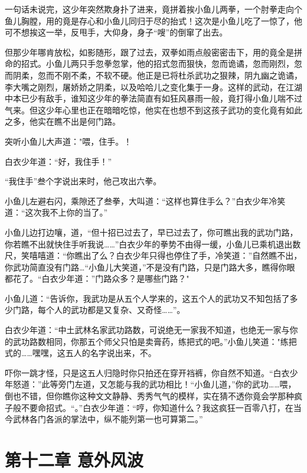 \documentclass[12pt,oneside]{book}
\begin{document}
一句话未说完，这少年突然欺身扑了进来，竟拼着挨小鱼儿两拳，一个肘拳走向个鱼儿胸膛，用的竟是存心和小鱼儿同归于尽的抬式！这次是小鱼儿吃了一惊了，他可不想挨这一举，反甩手，大仰身，身子``嗖''的倒窜了出去。

但那少年哪肯放松，如影随形，跟了过去，双拳如雨点般密密击下，用的竟全是拼命的招式。小鱼儿两只手忽拳忽掌，他的招式忽而狠快，忽而诡谲，忽而刚烈，忽而阴柔，忽而不刚不柔，不软不硬。他正是已将杜杀武功之狠辣，阴九幽之诡谲，李大嘴之刚烈，屠娇娇之阴柔，以及哈哈儿之变化集于一身。这样的武动，在江湖中本已少有敌手，谁知这少年的拳法简直有如狂风暴雨一般，竟打得小鱼儿喘不过气来。但这少年心里也正在暗暗吃惊，他实在也想不到这孩子武功的变化竟有如此之多，他实在瞧不出是何门路。

突听小鱼儿大声道："喂，住手。！

白衣少年道：``好，我住手！''

``我住手''叁个字说出来时，他己攻出六拳。

小鱼儿左避右闪，乘隙还了叁拳，大叫道：``这样也算住手么？''白衣少年冷笑道：``这次我不上你的当了。''

小鱼儿边打边嚷，道，``但十招已过去了，早已过去了，你可瞧出我的武功门路，你若瞧不出就快住手听我说\ldots\ldots{}''白衣少年的拳势不由得一缓，小鱼儿已乘机退出数尺，笑嘻嘻道：``你瞧出了么？白衣少年只得也停住了手，冷笑道：''自然瞧不出，你武功简直没有门路\ldots{}``小鱼儿大笑道，''不是没有门路，只是门路大多，瞧得你眼都花了。``白衣少年道：''门路众多？是哪些门路？"

小鱼儿道：``告诉你，我武功是从五个人学来的，这五个人的武功又不知包括了多少门路，每个人的武功都是又复杂、又奇怪\ldots\ldots{}''。

白衣少年道：``中土武林名家武功路数，可说绝无一家我不知道，也绝无一家与你的武功路数相同，你那五个师父只怕是卖膏药，练把式的吧。''小鱼儿笑道："练把式的\ldots\ldots 嘿嘿，这五人的名字说出来，不。

吓你一跳才怪，只是这五人归隐时你只拍还在穿开裆裤，你自然不知道。``白衣少年怒道：''此等旁门左道，又怎能与我的武功相比！``小鱼儿道，''你的武功\ldots\ldots 喂，倒也不错，但你瞧你这种文文静静、秀秀气气的模样，实在猜不透你竟会学那种疯子般不要命招式。``。''白衣少年道：``哼，你知道什么？我这疯狂一百零八打，在当今武林各门各派的掌法中，纵不能列第一也可算第二。''

\hypertarget{ux7b2cux5341ux4e8cux7ae0-ux610fux5916ux98ceux6ce2}{%
\chapter{第十二章
意外风波}\label{ux7b2cux5341ux4e8cux7ae0-ux610fux5916ux98ceux6ce2}}
\end{document}
